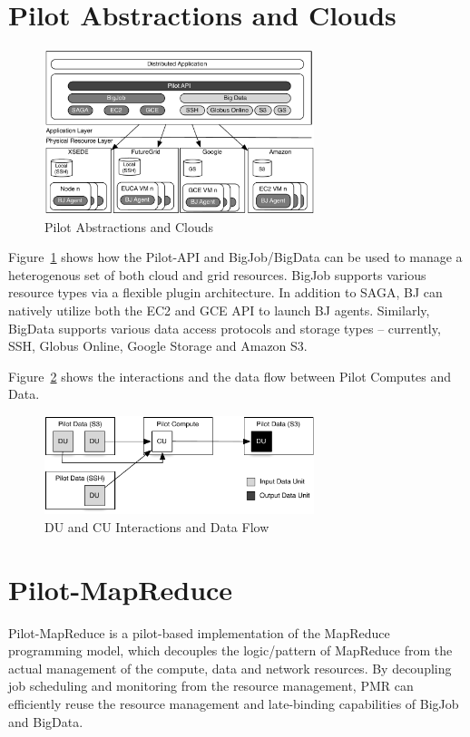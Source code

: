 \documentclass[times]{cpeauth}
\begin{document}
\section{Pilot Abstractions and Clouds}


\begin{figure}[t]
	\centering
		\includegraphics[width=0.7\textwidth]{figures/cloud_pilot_job.pdf}
	\caption{Pilot Abstractions and Clouds}
	\label{fig:figures_cloud_pilot_job}
\end{figure}
Figure~\ref{fig:figures_cloud_pilot_job} shows how the Pilot-API and 
BigJob/BigData can be used to manage a heterogenous set of both cloud and grid 
resources. BigJob supports various resource types via a flexible plugin 
architecture. In addition to SAGA, BJ can natively utilize both the EC2 and 
GCE API to launch BJ agents. Similarly, BigData supports various data access
protocols and storage types -- currently, SSH, Globus Online, Google Storage
and Amazon S3.



Figure~\ref{fig:figures_data-flow} shows the interactions and the data flow 
between Pilot Computes and Data.
\begin{figure}[htbp]
	\centering
		\includegraphics[width=0.7\textwidth]{figures/data-flow.pdf}
	\caption{DU and CU Interactions and Data Flow}
	\label{fig:figures_data-flow}
\end{figure}

\section{Pilot-MapReduce}
Pilot-MapReduce is a pilot-based implementation of the MapReduce
programming model, which decouples the logic/pattern of MapReduce from
the actual management of the compute, data and network resources. By
decoupling job scheduling and monitoring from the resource management,
PMR can efficiently reuse the resource management and late-binding
capabilities of BigJob and BigData.
\end{document}
